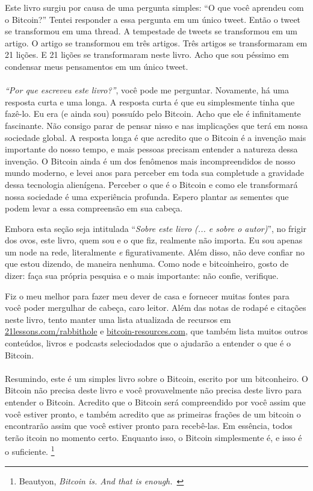 Este livro surgiu por causa de uma pergunta simples: {\enquote{O que você aprendeu com o Bitcoin?}} Tentei responder a essa pergunta em um único tweet. Então o tweet se transformou em uma thread. A tempestade de tweets se transformou em um artigo. O artigo se transformou em três artigos. Três artigos se transformaram em 21 lições. E 21 lições se transformaram neste livro. Acho que sou péssimo em condensar meus pensamentos em um único tweet.

\paragraph{}
\textit{\enquote{Por que escreveu este livro?}}, você pode me perguntar. Novamente, há uma resposta curta e uma longa. A resposta curta é que eu simplesmente tinha que fazê-lo. Eu era (e ainda sou) {possuído} pelo Bitcoin. Acho que ele é infinitamente fascinante. Não consigo parar de pensar nisso e nas implicações que terá em nossa sociedade global. A resposta longa é que acredito que o Bitcoin é a invenção mais importante do nosso tempo, e mais pessoas precisam entender a natureza dessa invenção. O Bitcoin ainda é um dos fenômenos mais incompreendidos de nosso mundo moderno, e levei anos para perceber em toda sua completude a gravidade dessa tecnologia alienígena. Perceber o que é o Bitcoin e como ele transformará nossa sociedade é uma experiência profunda. Espero plantar as sementes que podem levar a essa compreensão em sua cabeça.

Embora esta seção seja intitulada \enquote{\textit{Sobre este livro (... e sobre o autor)}}, no frigir dos ovos, este livro, quem sou e o que fiz, realmente não importa. Eu sou apenas um node na rede, literalmente \textit{e} figurativamente. Além disso, não deve confiar no que estou dizendo, de maneira nenhuma. Como node e bitcoinheiro, gosto de dizer: faça sua própria pesquisa e o mais importante: não confie, verifique.

Fiz o meu melhor para fazer meu dever de casa e fornecer muitas fontes para você poder mergulhar de cabeça, caro leitor. Além das notas de rodapé e citações neste livro, tento manter uma lista atualizada de recursos em \href{https://21lessons.com/rabbithole}{21lessons.com/rabbithole} e \href{https://bitcoin-resources.com}{bitcoin-resources.com}, que também lista muitos outros conteúdos, livros e podcasts seleciodados que o ajudarão a entender o que é o Bitcoin.

\paragraph{}
Resumindo, este é um simples livro sobre o Bitcoin, escrito por um bitconheiro. O Bitcoin não precisa deste livro e você provavelmente não precisa deste livro para entender o Bitcoin. Acredito que o Bitcoin será compreendido por você assim que {você} estiver pronto, e também acredito que as primeiras frações de um bitcoin o encontrarão assim que você estiver pronto para recebê-las. Em essência, todos terão \bitcoinB{}itcoin no momento certo. Enquanto isso, o Bitcoin simplesmente é, e isso é o suficiente. \footnote{Beautyon, \textit{Bitcoin is. And that is enough.}~\cite{bitcoin-is}}
